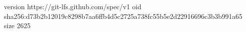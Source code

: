 version https://git-lfs.github.com/spec/v1
oid sha256:d73b2b12019c8298b7aa6ffb4d5c2725a738fc55b5e2d22916696c3b3b991a65
size 2625
